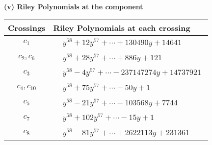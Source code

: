 \documentclass[1p]{elsarticle_modified}
\theoremstyle{definition}
\begin{document}
\newpage\renewcommand{\arraystretch}{1}
\flushleft \textbf{(v) Riley Polynomials at the component}\newline \\
\begin{tabular}{m{50pt}|m{274pt}}
Crossings & \hspace{64pt}Riley Polynomials at each crossing \\
\hline $$\begin{aligned}c_{1}\end{aligned}$$&$\begin{aligned}
&y^{58}+12 y^{57}+\cdots+130490 y+14641
\end{aligned}$\\
\hline $$\begin{aligned}c_{2},c_{6}\end{aligned}$$&$\begin{aligned}
&y^{58}+28 y^{57}+\cdots+886 y+121
\end{aligned}$\\
\hline $$\begin{aligned}c_{3}\end{aligned}$$&$\begin{aligned}
&y^{58}-4 y^{57}+\cdots-237147274 y+14737921
\end{aligned}$\\
\hline $$\begin{aligned}c_{4},c_{10}\end{aligned}$$&$\begin{aligned}
&y^{58}+75 y^{57}+\cdots-50 y+1
\end{aligned}$\\
\hline $$\begin{aligned}c_{5}\end{aligned}$$&$\begin{aligned}
&y^{58}-21 y^{57}+\cdots-103568 y+7744
\end{aligned}$\\
\hline $$\begin{aligned}c_{7}\end{aligned}$$&$\begin{aligned}
&y^{58}+102 y^{57}+\cdots-15 y+1
\end{aligned}$\\
\hline $$\begin{aligned}c_{8}\end{aligned}$$&$\begin{aligned}
&y^{58}-81 y^{57}+\cdots+2622113 y+231361
\end{aligned}$\\

\end{tabular}
\end{document}
